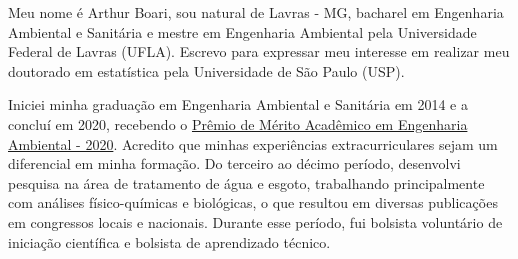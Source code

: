 \documentclass[12pt,a4paper]{article}
\begin{document}
	
	
	Meu nome é Arthur Boari, sou natural de Lavras - MG, bacharel em Engenharia Ambiental e Sanitária e mestre em Engenharia Ambiental pela Universidade Federal de Lavras (UFLA). Escrevo para expressar meu interesse em realizar meu doutorado em estatística pela Universidade de São Paulo (USP).
	
	Iniciei minha graduação em Engenharia Ambiental e Sanitária em 2014 e a concluí em 2020, recebendo o \href{https://ufla.br/noticias/ensino/14064-etapa-concluida-mais-de-500-novos-profissionais-formados-pela-ufla}{Prêmio de Mérito Acadêmico em Engenharia Ambiental - 2020}. Acredito que minhas experiências extracurriculares sejam um diferencial em minha formação. Do terceiro ao décimo período, desenvolvi pesquisa na área de tratamento de água e esgoto, trabalhando principalmente com análises físico-químicas e biológicas, o que resultou em diversas publicações em congressos locais e nacionais. Durante esse período, fui bolsista voluntário de iniciação científica e bolsista de aprendizado técnico.
	
\end{document}
